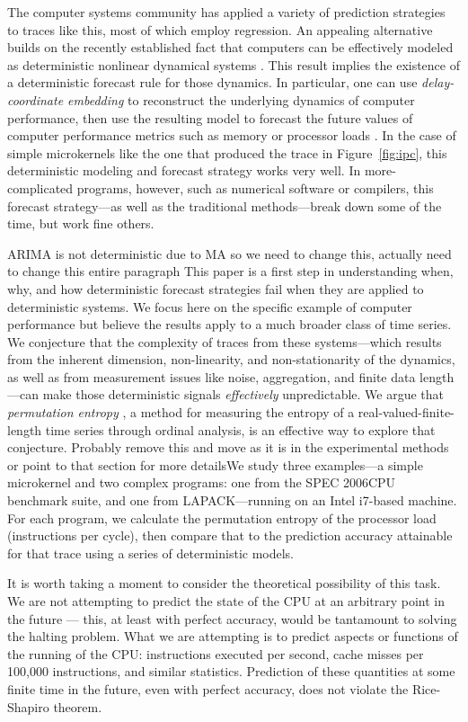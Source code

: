 The computer systems community has applied a variety of prediction
strategies to traces like this, most of which employ regression.  An
appealing alternative builds on the recently established fact that
computers can be effectively modeled as deterministic nonlinear
dynamical systems \cite{mytkowicz09}.  This result implies the
existence of a deterministic forecast rule for those dynamics.  In
particular, one can use \emph{delay-coordinate embedding} to
reconstruct the underlying dynamics of computer performance, then use
the resulting model to forecast the future values of computer
performance metrics such as memory or processor loads
\cite{josh-ida2011}.  In the case of simple microkernels like the one
that produced the trace in Figure~\ref{fig:ipc}, this deterministic
modeling and forecast strategy works very well.  In more-complicated
programs, however, such as numerical software or compilers,
this forecast strategy---as well as the traditional methods---break
down some of the time, but work fine others.

{\color{red} ARIMA is not deterministic due to MA so we need to change this, actually need to change this entire paragraph} This paper is a first step in understanding when, why, and how
deterministic forecast strategies fail when they are applied to
deterministic systems.  We focus here on the specific example of
computer performance but believe the results apply to a much broader class of time series.  We conjecture that the complexity of traces
from these systems---which results from the inherent dimension,
non-linearity, and non-stationarity of the dynamics, as well as from
measurement issues like noise, aggregation, and finite data
length---can make those deterministic signals \emph{effectively}
unpredictable.  We argue that \emph{permutation entropy}
\cite{bandt2002per}, a method for measuring the entropy of a
real-valued-finite-length time series through ordinal analysis, is an
effective way to explore that conjecture.  {\color{red} Probably remove this and move as it is in the experimental methods or point to that section for more details}We study three
examples---a simple microkernel and two complex programs: one from the
SPEC 2006CPU benchmark suite, and one from LAPACK---running on an Intel i7-based machine.  For
each program, we calculate the permutation entropy of the processor
load (instructions per cycle), then compare that to the prediction accuracy attainable for
that trace using a series of deterministic models.

It is worth taking a moment to consider the theoretical possibility of
this task. We are not attempting to predict the state of the CPU at an
arbitrary point in the future --- this, at least with perfect
accuracy, would be tantamount to solving the halting problem. What we
are attempting is to predict aspects or functions of the running of
the CPU: instructions executed per second, cache misses per 100,000
instructions, and similar statistics. Prediction of these quantities
at some finite time in the future, even with perfect accuracy, does
not violate the Rice-Shapiro theorem.

